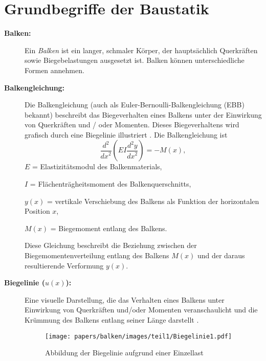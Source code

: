 %
%
%
%
\section{Grundbegriffe der Baustatik}
\label{balken:section:teil1}
\begin{description}
\item[\textbf{Balken:}] Ein {\em Balken} ist ein langer, schmaler Körper, der hauptsächlich Querkräften sowie Biegebelastungen ausgesetzt ist.
%
Balken können unterschiedliche Formen annehmen.

\item[\textbf{Balkengleichung:}] Die Balkengleichung (auch als Euler-Bernoulli-Balkengleichung (EBB) bekannt) beschreibt das Biegeverhalten eines Balkens unter der Einwirkung von Querkräften und / oder Momenten.
%
%
Dieses Biegeverhaltens wird grafisch durch eine Biegelinie illustriert \cite{balken:Biegelinie}. 
Die Balkengleichung ist
\begin{equation*}
	\frac{d^2}{{dx}^2}\left(EI\frac{d^2y}{{dx}^2}\right)
	=-M(x),
\end{equation*}
$E$ = Elastizitätsmodul des Balkenmaterials,

$I$ = Flächenträgheitsmoment des Balkenquerschnitts,

$y(x)$ = vertikale Verschiebung des Balkens als Funktion der horizontalen Position $x$,

$M(x)$ = Biegemoment entlang des Balkens.

Diese Gleichung beschreibt die Beziehung zwischen der Biegemomentenverteilung entlang des Balkens $M(x)$ und der daraus resultierende Verformung $y(x)$.

\item[\textbf{Biegelinie ($u(x)$):}] Eine visuelle Darstellung, die das Verhalten eines Balkens unter Einwirkung von Querkräften und/oder Momenten veranschaulicht und die Krümmung des Balkens entlang seiner Länge darstellt \cite{balken:Biegelinie}.
%
\begin{figure}
	\centering
	\texttt{[image: papers/balken/images/teil1/Biegelinie1.pdf]}
	\caption{Abbildung der Biegelinie aufgrund einer Einzellast}
	\label{fig:Abbildung der Biegelinie aufgrund einer Einzellast}
\end{figure}


\end{description}
